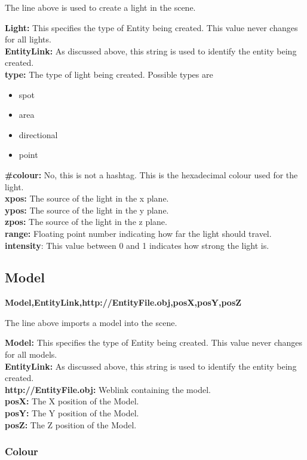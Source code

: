\documentclass[a4paper,12pt]{article}
\begin{document}
The line above is used to create a light in the scene.

\textbf{Light:} This specifies the type of Entity being created. This value never changes for all lights.\\
\textbf{EntityLink:} As discussed above, this string is used to identify the entity being created.\\
\textbf{type:} The type of light being created. Possible types are
\begin{itemize}
\item spot
\item area
\item directional
\item point
\end{itemize}
\textbf{\#colour:} No, this is not a hashtag. This is the hexadecimal colour used for the light.\\
\textbf{xpos:} The source of the light in the x plane.\\
\textbf{ypos:} The source of the light in the y plane.\\
\textbf{zpos:} The source of the light in the z plane.\\
\textbf{range:} Floating point number indicating how far the light should travel.\\
\textbf{intensity}: This value between 0 and 1 indicates how strong the light is.

\subsection{Model}

\textbf{Model,EntityLink,http://EntityFile.obj,posX,posY,posZ}

The line above imports a model into the scene.

\textbf{Model:} This specifies the type of Entity being created. This value never changes for all models.\\
\textbf{EntityLink:} As discussed above, this string is used to identify the entity being created.\\
\textbf{http://EntityFile.obj:} Weblink containing the model.\\
\textbf{posX:} The X position of the Model.\\
\textbf{posY:} The Y position of the Model.\\
\textbf{posZ:} The Z position of the Model.\\

\subsubsection{Colour}
\end{document}
